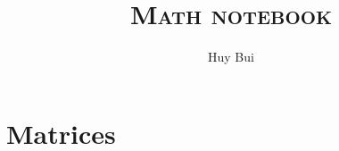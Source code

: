 \documentclass[twoside]{book}
\author{Huy Bui}
\title{\textsc{Math notebook}}
\theoremstyle{definition}
\begin{document}
\tableofcontents
\part{Matrices}



\end{document}
